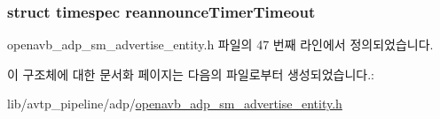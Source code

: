 \subsubsection[{\texorpdfstring{reannounce\+Timer\+Timeout}{reannounceTimerTimeout}}]{\setlength{\rightskip}{0pt plus 5cm}struct timespec reannounce\+Timer\+Timeout}\hypertarget{structopenavb__adp__sm__advertise__entity__vars__t_a5a923bb84c550b6215326f2b61b61317}{}\label{structopenavb__adp__sm__advertise__entity__vars__t_a5a923bb84c550b6215326f2b61b61317}


openavb\+\_\+adp\+\_\+sm\+\_\+advertise\+\_\+entity.\+h 파일의 47 번째 라인에서 정의되었습니다.



이 구조체에 대한 문서화 페이지는 다음의 파일로부터 생성되었습니다.\+:\begin{DoxyCompactItemize}
\item 
lib/avtp\+\_\+pipeline/adp/\hyperlink{openavb__adp__sm__advertise__entity_8h}{openavb\+\_\+adp\+\_\+sm\+\_\+advertise\+\_\+entity.\+h}\end{DoxyCompactItemize}
